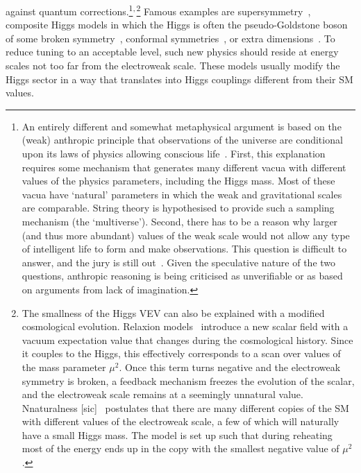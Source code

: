 against quantum corrections.\footnote{An entirely different and
  somewhat metaphysical argument is based on the (weak) anthropic
  principle that observations of the universe are conditional upon its
  laws of physics allowing conscious life~\cite{Weinberg:1987dv,
    Barrow:1988yia}. First, this explanation requires some mechanism
  that generates many different vacua with different values of the
  physics parameters, including the Higgs mass. Most of these vacua
  have `natural' parameters in which the weak and gravitational scales
  are comparable. String theory is hypothesised to provide such a
  sampling mechanism (the `multiverse'). Second, there has to be a
  reason why larger (and thus more abundant) values of the weak scale
  would not allow any type of intelligent life to form and make
  observations. This question is difficult to answer, and the jury is
  still out~\cite{Agrawal:1997gf, Harnik:2006vj, Clavelli:2006di,
    Giudice:2008bi, Donoghue:2009me, Gedalia:2010iy,
    Adams:2015hvd}. Given the speculative nature of the two questions,
  anthropic reasoning is being criticised as unverifiable or as based
  on arguments from lack of
  imagination.}\textsuperscript{,\,}\footnote{The smallness
  of the Higgs VEV can also be explained with a modified cosmological
  evolution. Relaxion models~\cite{Graham:2015cka} introduce a new
  scalar field with a vacuum expectation value that changes during the
  cosmological history. Since it couples to the Higgs, this
  effectively corresponds to a scan over values of the mass parameter
  $\mu^2$. Once this term turns negative and the electroweak symmetry
  is broken, a feedback mechanism freezes the evolution of the scalar,
  and the electroweak scale remains at a seemingly unnatural
  value. Nnaturalness [sic]~\cite{Arkani-Hamed:2016rle} postulates
  that there are many different copies of the SM with different values
  of the electroweak scale, a few of which will naturally have a small
  Higgs mass. The model is set up such that during reheating most of
  the energy ends up in the copy with the smallest negative value of
  $\mu^2$.} Famous examples are supersymmetry~\cite{Nilles:1983ge,
  Haber:1984rc, Martin:1997ns}, composite Higgs models in which the
Higgs is often the pseudo-Goldstone boson of some broken
symmetry~\cite{Kaplan:1983fs, Kaplan:1983sm, Banks:1984gj,
  Agashe:2004rs, Gripaios:2009pe}, conformal
symmetries~\cite{Bardeen:1995kv}, or extra
dimensions~\cite{ArkaniHamed:1998rs, ArkaniHamed:1998nn,
  Randall:1999ee, Appelquist:2000nn}. To reduce tuning to an
acceptable level, such new physics should reside at energy scales not
too far from the electroweak scale. These models usually modify the
Higgs sector in a way that translates into Higgs couplings different
from their SM values.

